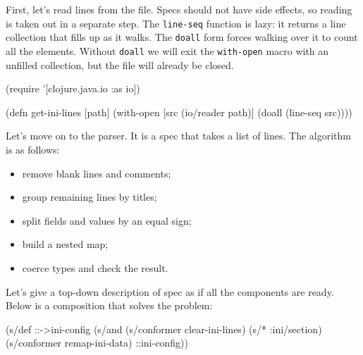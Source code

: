 
First, let's read lines from the file. Specs should not have side effects, so reading is taken out in a separate step. The \verb|line-seq| function is lazy: it returns a line collection that fills up as it walks. The \verb|doall| form forces walking over it to count all the elements. Without \verb|doall| we will exit the \verb|with-open| macro with an unfilled collection, but the file will already be closed.



\begin{english}
  \begin{clojure}
(require '[clojure.java.io :as io])

(defn get-ini-lines [path]
  (with-open [src (io/reader path)]
    (doall (line-seq src))))
  \end{clojure}
\end{english}

Let's move on to the parser. It is a spec that takes a list of lines. The algorithm is as follows:

\begin{itemize}

\item
  remove blank lines and comments;

\item
  group remaining lines by titles;

\item
  split fields and values by an equal sign;

\item
  build a nested map;

\item
  coerce types and check the result.

\end{itemize}

Let's give a top-down description of spec as if all the components are ready. Below is a composition that solves the problem:

\begin{english}
  \begin{clojure}
(s/def ::->ini-config
  (s/and
   (s/conformer clear-ini-lines)
   (s/* :ini/section)
   (s/conformer remap-ini-data)
   ::ini-config))
  \end{clojure}
\end{english}

